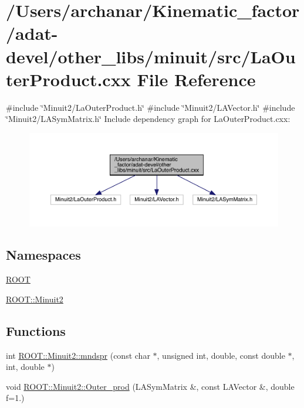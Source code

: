\hypertarget{adat-devel_2other__libs_2minuit_2src_2LaOuterProduct_8cxx}{}\section{/\+Users/archanar/\+Kinematic\+\_\+factor/adat-\/devel/other\+\_\+libs/minuit/src/\+La\+Outer\+Product.cxx File Reference}
\label{adat-devel_2other__libs_2minuit_2src_2LaOuterProduct_8cxx}
{\ttfamily \#include \char`\"{}Minuit2/\+La\+Outer\+Product.\+h\char`\"{}}\newline
{\ttfamily \#include \char`\"{}Minuit2/\+L\+A\+Vector.\+h\char`\"{}}\newline
{\ttfamily \#include \char`\"{}Minuit2/\+L\+A\+Sym\+Matrix.\+h\char`\"{}}\newline
Include dependency graph for La\+Outer\+Product.\+cxx\+:
\nopagebreak
\begin{figure}[H]
\begin{center}
\leavevmode
\includegraphics[width=350pt]{d3/d21/adat-devel_2other__libs_2minuit_2src_2LaOuterProduct_8cxx__incl}
\end{center}
\end{figure}
\subsection*{Namespaces}
\begin{DoxyCompactItemize}
\item 
 \mbox{\hyperlink{namespaceROOT}{R\+O\+OT}}
\item 
 \mbox{\hyperlink{namespaceROOT_1_1Minuit2}{R\+O\+O\+T\+::\+Minuit2}}
\end{DoxyCompactItemize}
\subsection*{Functions}
\begin{DoxyCompactItemize}
\item 
int \mbox{\hyperlink{namespaceROOT_1_1Minuit2_acc89c3c759da8dc191d0a862e354a555}{R\+O\+O\+T\+::\+Minuit2\+::mndspr}} (const char $\ast$, unsigned int, double, const double $\ast$, int, double $\ast$)
\item 
void \mbox{\hyperlink{namespaceROOT_1_1Minuit2_ac07a37ec0cf04b47c95ddc6943487ef2}{R\+O\+O\+T\+::\+Minuit2\+::\+Outer\+\_\+prod}} (L\+A\+Sym\+Matrix \&, const L\+A\+Vector \&, double f=1.)
\end{DoxyCompactItemize}
